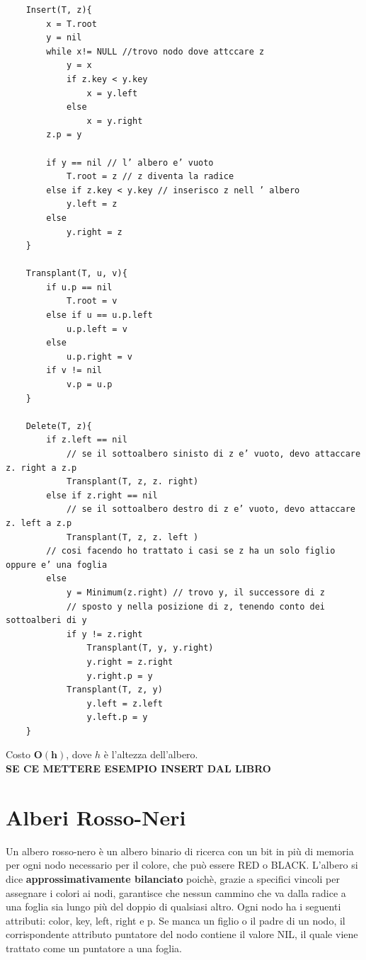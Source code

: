 \begin{verbatim}
    Insert(T, z){
        x = T.root
        y = nil
        while x!= NULL //trovo nodo dove attccare z
            y = x
            if z.key < y.key
                x = y.left
            else
                x = y.right
        z.p = y
        
        if y == nil // l’ albero e’ vuoto
            T.root = z // z diventa la radice
        else if z.key < y.key // inserisco z nell ’ albero
            y.left = z
        else
            y.right = z
    }

    Transplant(T, u, v){
        if u.p == nil
            T.root = v
        else if u == u.p.left
            u.p.left = v
        else
            u.p.right = v
        if v != nil
            v.p = u.p
    }

    Delete(T, z){
        if z.left == nil
            // se il sottoalbero sinisto di z e’ vuoto, devo attaccare z. right a z.p
            Transplant(T, z, z. right)
        else if z.right == nil
            // se il sottoalbero destro di z e’ vuoto, devo attaccare z. left a z.p
            Transplant(T, z, z. left )
        // cosi facendo ho trattato i casi se z ha un solo figlio oppure e’ una foglia
        else
            y = Minimum(z.right) // trovo y, il successore di z
            // sposto y nella posizione di z, tenendo conto dei sottoalberi di y
            if y != z.right
                Transplant(T, y, y.right)
                y.right = z.right
                y.right.p = y  
            Transplant(T, z, y)
                y.left = z.left
                y.left.p = y
    }
\end{verbatim}
\noindent Costo $\mathbf{O(h)}$, dove $h$ è l'altezza dell'albero.\\
\textbf{SE CE METTERE ESEMPIO INSERT DAL LIBRO}
\section{Alberi Rosso-Neri}
Un albero rosso-nero è un albero binario di ricerca con un bit in più di memoria per ogni nodo
necessario per il colore, che può essere RED o BLACK. L’albero si dice \textbf{approssimativamente
bilanciato} poichè, grazie a specifici vincoli per assegnare i colori ai nodi, garantisce che nessun
cammino che va dalla radice a una foglia sia lungo più del doppio di qualsiasi altro.
Ogni nodo ha i seguenti attributi: color, key, left, right e p. Se manca un figlio o il padre di
un nodo, il corrispondente attributo puntatore del nodo contiene il valore NIL, il quale viene
trattato come un puntatore a una foglia.\\
